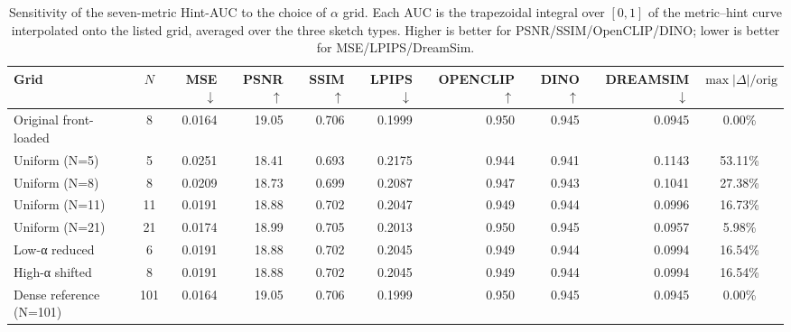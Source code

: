 \begin{table}[t]
  \centering
  \caption{Sensitivity of the seven-metric Hint-AUC to the choice of $\alpha$ grid. Each AUC is the trapezoidal integral over $[0,1]$ of the metric--hint curve interpolated onto the listed grid, averaged over the three sketch types. Higher is better for PSNR/SSIM/OpenCLIP/DINO; lower is better for MSE/LPIPS/DreamSim.}
  \label{tab:S-R2-1-B-2-7m}
  \small
  \begin{tabular}{l c rrrrrrr c}
    \toprule
    Grid & $N$ & MSE $\downarrow$ & PSNR $\uparrow$ & SSIM $\uparrow$ & LPIPS $\downarrow$ & OPENCLIP $\uparrow$ & DINO $\uparrow$ & DREAMSIM $\downarrow$ & $\max\!\big|\Delta\big|/\mathrm{orig}$ \\
    \midrule
    Original front-loaded      &   8 & 0.0164 & 19.05 & 0.706 & 0.1999 & 0.950 & 0.945 & 0.0945 &  0.00\% \\
    Uniform (N=5)              &   5 & 0.0251 & 18.41 & 0.693 & 0.2175 & 0.944 & 0.941 & 0.1143 & 53.11\% \\
    Uniform (N=8)              &   8 & 0.0209 & 18.73 & 0.699 & 0.2087 & 0.947 & 0.943 & 0.1041 & 27.38\% \\
    Uniform (N=11)             &  11 & 0.0191 & 18.88 & 0.702 & 0.2047 & 0.949 & 0.944 & 0.0996 & 16.73\% \\
    Uniform (N=21)             &  21 & 0.0174 & 18.99 & 0.705 & 0.2013 & 0.950 & 0.945 & 0.0957 &  5.98\% \\
    Low-α reduced              &   6 & 0.0191 & 18.88 & 0.702 & 0.2045 & 0.949 & 0.944 & 0.0994 & 16.54\% \\
    High-α shifted             &   8 & 0.0191 & 18.88 & 0.702 & 0.2045 & 0.949 & 0.944 & 0.0994 & 16.54\% \\
    Dense reference (N=101)    & 101 & 0.0164 & 19.05 & 0.706 & 0.1999 & 0.950 & 0.945 & 0.0945 &  0.00\% \\
    \bottomrule
  \end{tabular}
\end{table}
